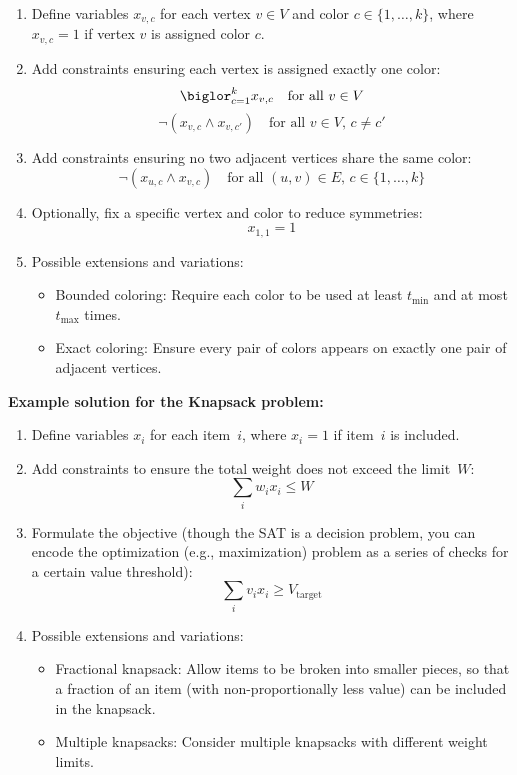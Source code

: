 \documentclass[a4paper,12pt]{article}
\begin{document}
\begin{tasks}
    \begin{enumerate}
        \item Define variables $x_{v,c}$ for each vertex $v \in V$ and color $c \in \{1,\dots,k\}$, where $x_{v,c}=1$ if vertex $v$ is assigned color $c$.
        \item Add constraints ensuring each vertex is assigned exactly one color:
        \[
            \biglor_{c=1}^{k} x_{v,c} \quad \text{for all } v \in V
        \]
        \[
            \neg(x_{v,c} \land x_{v,c'}) \quad \text{for all } v \in V, \, c \neq c'
        \]
        \item Add constraints ensuring no two adjacent vertices share the same color:
        \[
            \neg(x_{u,c} \land x_{v,c}) \quad \text{for all } (u,v) \in E, \, c \in \{1,\dots,k\}
        \]
        \item Optionally, fix a specific vertex and color to reduce symmetries:
        \[
            x_{1,1} = 1
        \]
        \item Possible extensions and variations:
        \begin{itemize}[left=0pt]
            \item Bounded coloring: Require each color to be used at least $t_{\min}$ and at most $t_{\max}$ times.
            \item Exact coloring: Ensure every pair of colors appears on exactly one pair of adjacent vertices.
        \end{itemize}
    \end{enumerate}

    \medskip
    \textbf{Example solution for the Knapsack problem:}

    \begin{enumerate}
        \item Define variables $x_i$ for each item~$i$, where $x_i = 1$ if item~$i$ is included.
        \item Add constraints to ensure the total weight does not exceed the limit~$W$:
        \[
            \sum_{i} w_i x_i \leq W
        \]
        \item Formulate the objective (though the SAT is a decision problem, you can encode the optimization (e.g., maximization) problem as a series of checks for a certain value threshold):
        \[
            \sum_{i} v_i x_i \geq V_{\text{target}}
        \]
        \item Possible extensions and variations:
        \begin{itemize}
            \item Fractional knapsack: Allow items to be broken into smaller pieces, so that a fraction of an item (with non-proportionally less value) can be included in the knapsack.
            \item Multiple knapsacks: Consider multiple knapsacks with different weight limits.
        \end{itemize}
    \end{enumerate}

\end{tasks}
\end{document}
